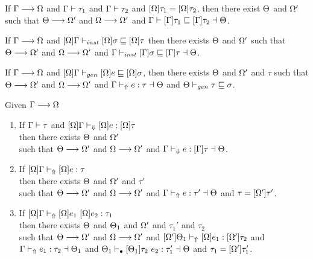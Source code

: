\begin{theorem}

If $\Gamma \longrightarrow \Omega$ and $\Gamma \vdash \tau_1$ and $\Gamma \vdash \tau_2$ and $[\Omega]\tau_1 = [\Omega]\tau_2$, then there exist $\Theta$ and $\Omega'$ such that $\Theta \longrightarrow \Omega'$ and $\Omega \longrightarrow \Omega'$ and $\Gamma \vdash [\Gamma]\tau_1 \sqsubseteq [\Gamma]\tau_2 \dashv \Theta$.
\end{theorem}

\begin{theorem}

If $\Gamma \longrightarrow \Omega$ and $[\Omega]\Gamma \vdash_{inst} [\Omega]\sigma \sqsubseteq [\Omega]\tau$
then there exists $\Theta$ and $\Omega'$
such that $\Theta \longrightarrow \Omega'$ and $\Omega \longrightarrow \Omega'$ and $\Gamma \vdash_{inst} [\Gamma]\sigma \sqsubseteq [\Gamma]\tau \dashv \Theta$.
\end{theorem}

\begin{theorem}

If $\Gamma \longrightarrow \Omega$ and $[\Omega] \Gamma \vdash_{gen} [\Omega]e \sqsubseteq [\Omega]\sigma$,
then there exists $\Theta$ and $\Omega'$ and $\tau$
such that $\Theta \longrightarrow \Omega'$ and $\Omega \longrightarrow \Omega'$ and $\Gamma \vdash_\Uparrow e : \tau \dashv \Theta$ and $\Theta \vdash_{gen} \tau \sqsubseteq \sigma$.
\end{theorem}

\begin{theorem}

Given $\Gamma \longrightarrow \Omega$
\begin{enumerate}
    \item If $\Gamma \vdash \tau$ and $[\Omega]\Gamma \vdash_\Downarrow [\Omega]e : [\Omega]\tau$\\
          then there exists $\Theta$ and $\Omega'$\\
          such that $\Theta \longrightarrow \Omega'$ and $\Omega \longrightarrow \Omega'$ and $\Gamma \vdash_\Downarrow e: [\Gamma]\tau \dashv \Theta$.
    \item If $[\Omega]\Gamma \vdash_\Uparrow [\Omega]e : \tau$\\
          then there exists $\Theta$ and $\Omega'$ and $\tau'$\\
          such that $\Theta \longrightarrow \Omega'$ and $\Omega \longrightarrow \Omega'$ and $\Gamma \vdash_\Uparrow e:\tau' \dashv \Theta$ and $\tau = [\Omega']\tau'$.
    \item If $[\Omega]\Gamma \vdash_\Uparrow [\Omega]e_1 ~ [\Omega]e_2 :\tau_1$\\
          then there exists $\Theta$ and $\Theta_1$ and $\Omega'$ and $\tau_1'$ and $\tau_2$\\
          such that $\Theta \longrightarrow \Omega'$ and $\Omega \longrightarrow \Omega'$ and $[\Omega']\Theta_1 \vdash_\Uparrow [\Omega]e_1 :[\Omega']\tau_2$ and $\Gamma \vdash_\Uparrow e_1 : \tau_2 \dashv \Theta_1$ and $\Theta_1 \vdash_\bullet [\Theta_1]\tau_2 ~ e_2 :\tau_1' \dashv \Theta$ and $\tau_1 = [\Omega']\tau_1'$.
\end{enumerate}
\end{theorem}
